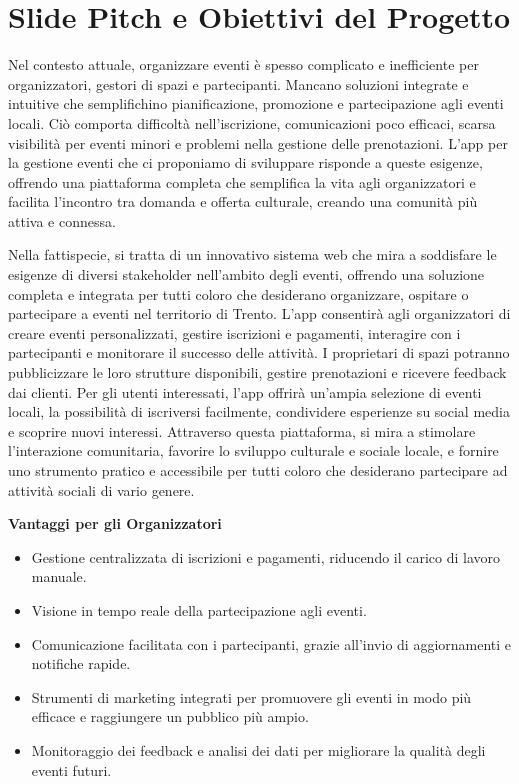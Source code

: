 \documentclass[9pt]{extarticle}
\begin{document}
\customtitle

\tableofcontents
\newpage

\section{Slide Pitch e Obiettivi del Progetto}

Nel contesto attuale, organizzare eventi è spesso complicato e inefficiente per organizzatori, gestori di spazi e partecipanti. Mancano soluzioni integrate e intuitive che semplifichino pianificazione, promozione e partecipazione agli eventi locali. Ciò comporta difficoltà nell'iscrizione, comunicazioni poco efficaci, scarsa visibilità per eventi minori e problemi nella gestione delle prenotazioni. L'app per la gestione eventi che ci proponiamo di sviluppare risponde a queste esigenze, offrendo una piattaforma completa che semplifica la vita agli organizzatori e facilita l'incontro tra domanda e offerta culturale, creando una comunità più attiva e connessa.

Nella fattispecie, si tratta di un innovativo sistema web che mira a soddisfare le esigenze di diversi stakeholder nell'ambito degli eventi, offrendo una soluzione completa e integrata per tutti coloro che desiderano organizzare, ospitare o partecipare a eventi nel territorio di Trento. L'app consentirà agli organizzatori di creare eventi personalizzati, gestire iscrizioni e pagamenti, interagire con i partecipanti e monitorare il successo delle attività. I proprietari di spazi potranno pubblicizzare le loro strutture disponibili, gestire prenotazioni e ricevere feedback dai clienti. Per gli utenti interessati, l'app offrirà un'ampia selezione di eventi locali, la possibilità di iscriversi facilmente, condividere esperienze su social media e scoprire nuovi interessi. Attraverso questa piattaforma, si mira a stimolare l'interazione comunitaria, favorire lo sviluppo culturale e sociale locale, e fornire uno strumento pratico e accessibile per tutti coloro che desiderano partecipare ad attività sociali di vario genere.

\textbf{Vantaggi per gli Organizzatori}
\begin{itemize}
	\item Gestione centralizzata di iscrizioni e pagamenti, riducendo il carico di lavoro manuale.
	\item Visione in tempo reale della partecipazione agli eventi.
	\item Comunicazione facilitata con i partecipanti, grazie all'invio di aggiornamenti e notifiche rapide.
	\item Strumenti di marketing integrati per promuovere gli eventi in modo più efficace e raggiungere un pubblico più ampio.
	\item Monitoraggio dei feedback e analisi dei dati per migliorare la qualità degli eventi futuri.
\end{itemize}
\end{document}
